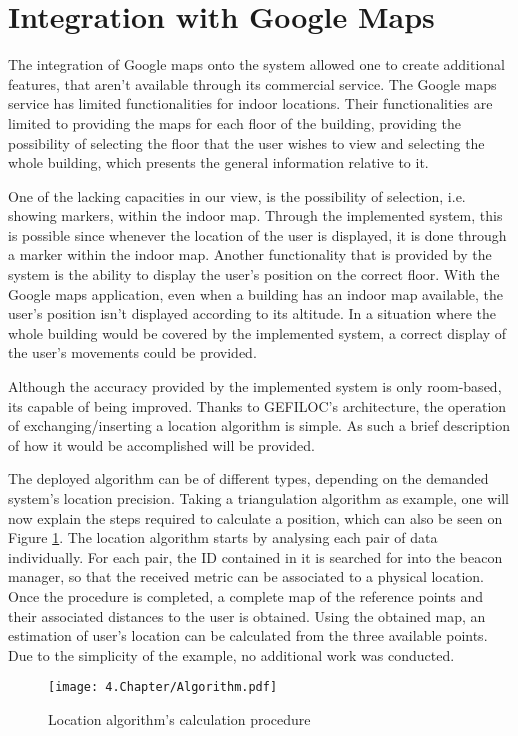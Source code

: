\section{Integration with Google Maps} 
\label{sec:gmaps} 
 
 
The integration of Google maps onto the system allowed one to create additional features, that aren't available through its commercial service. The Google maps service has limited functionalities for indoor locations. Their functionalities are limited to providing the maps for each floor of the building, providing the possibility of selecting the floor that the user wishes to view and selecting the whole building, which presents the general information relative to it.  
 
 
One of the lacking capacities in our view, is the possibility of selection, i.e. showing markers, within the indoor map. Through the implemented system, this is possible since whenever the location of the user is displayed, it is done through a marker within the indoor map. Another functionality that is provided by the system is the ability to display the user's position on the correct floor. With the Google maps application, even when a building has an indoor map available, the user's position isn't displayed according to its altitude. In a situation where the whole building would be covered by the implemented system, a correct display of the user's movements could be provided. 
 
 
Although the accuracy provided by the implemented system is only room-based, its capable of being improved. Thanks to GEFILOC's architecture, the operation of exchanging/inserting a location algorithm is simple. As such a brief description of how it would be accomplished will be provided. 
 
 
The deployed algorithm can be of different types, depending on the demanded system's location precision. Taking a triangulation algorithm as example, one will now explain the steps required to calculate a position, which can also be seen on Figure \ref{fig:algo}. The location algorithm starts by analysing each pair of data individually. For each pair, the ID contained in it is searched for into the beacon manager, so that the received metric can be associated to a physical location. Once the procedure is completed, a complete map of the reference points and their associated distances to the user is obtained. Using the obtained map, an estimation of user's location can be calculated from the three available points. Due to the simplicity of the example, no additional work was conducted. 
 
 
\begin{figure}[H] 
\centering 
\texttt{[image: 4.Chapter/Algorithm.pdf]} 
\caption[Location algorithm's calculation procedure]{Location algorithm's calculation procedure} 
\label{fig:algo} 
\end{figure} 
 